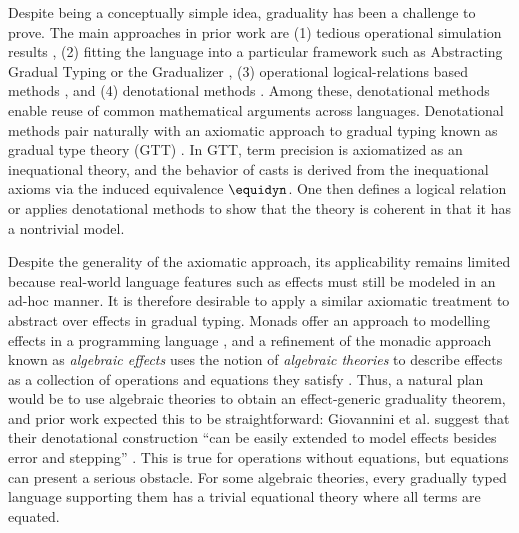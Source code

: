 \documentclass[acmsmall,screen,review,anonymous]{acmart}
\theoremstyle{remark}
\newif\ifdraft
\renewcommand{\max}[1]{\ifdraft{\color{blue}[{\bf Max says}: #1]}\fi}
\begin{document}
Despite being a conceptually simple idea, graduality has been a challenge to
prove. The main approaches in prior work are (1) tedious operational simulation
results \cite{siek_et_al:LIPIcs:2015:5031, siek-chen2021}, (2) fitting the
language into a particular framework such as Abstracting Gradual Typing or the
Gradualizer \cite{garcia-clark-tanter2016, cimini-siek2016}, (3) operational
logical-relations based methods \cite{new-ahmed2018, new-jamner-ahmed19,
new-licata-ahmed2019}, and (4) denotational methods
\cite{new-licata18,gtt-sgdt}.
%
%
%
Among these, denotational methods enable reuse of common mathematical arguments
across languages. Denotational methods pair naturally with an axiomatic approach
to gradual typing known as gradual type theory (GTT) \cite{new-licata18,
new-licata-ahmed2019}. In GTT, term precision is axiomatized as an inequational
theory, and the behavior of casts is derived from the inequational axioms via
the induced equivalence $\equidyn$. One then defines a logical relation or
applies denotational methods to show that the theory is coherent in that it has
a nontrivial model.

Despite the generality of the axiomatic approach, its applicability remains
limited because real-world language features such as effects must still be
modeled in an ad-hoc manner. It is therefore desirable to apply a similar
axiomatic treatment to abstract over effects in gradual typing. Monads offer an
approach to modelling effects in a programming language \cite{39155,
MOGGI199155}, and a refinement of the monadic approach known as \emph{algebraic
effects} uses the notion of \emph{algebraic theories} to describe effects as a
collection of operations and equations they satisfy \cite{PLOTKIN2001332,
plotkinpower2003}.
%
Thus, a natural plan would be to use algebraic theories to obtain an
effect-generic graduality theorem, and prior work expected this to be
straightforward: Giovannini et al. suggest that their denotational construction
``can be easily extended to model effects besides error and stepping''
\cite{gtt-sgdt}.
%
This is true for operations without equations, but equations can present a
serious obstacle. For some algebraic theories, every gradually typed language
supporting them has a trivial equational theory where all terms are equated.
\end{document}
